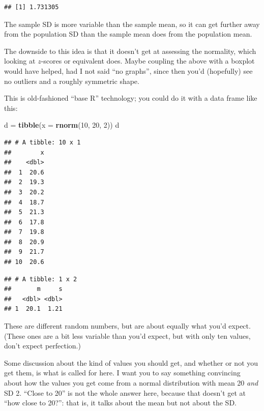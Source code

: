 \documentclass[]{tufte-book}
\newenvironment{Shaded}{}{}
\newcommand{\DataTypeTok}[1]{\textcolor[rgb]{0.56,0.13,0.00}{#1}}
\newcommand{\DecValTok}[1]{\textcolor[rgb]{0.25,0.63,0.44}{#1}}
\newcommand{\KeywordTok}[1]{\textcolor[rgb]{0.00,0.44,0.13}{\textbf{#1}}}
\newcommand{\NormalTok}[1]{#1}
\newcommand{\OperatorTok}[1]{\textcolor[rgb]{0.40,0.40,0.40}{#1}}
\newcommand{\StringTok}[1]{\textcolor[rgb]{0.25,0.44,0.63}{#1}}
\theoremstyle{definition}
\theoremstyle{definition}
\theoremstyle{definition}
\theoremstyle{remark}
\begin{document}
\begin{verbatim}
## [1] 1.731305
\end{verbatim}

The sample SD is more variable than the sample mean, so it can get
further away from the population SD than the sample mean does from the
population mean.

The downside to this idea is that it doesn't get at assessing the
normality, which looking at \(z\)-scores or equivalent does. Maybe
coupling the above with a boxplot would have helped, had I not said ``no
graphs'', since then you'd (hopefully) see no outliers and a roughly
symmetric shape.

This is old-fashioned ``base R'' technology; you could do it with a data
frame like this:

\begin{Shaded}
\begin{Highlighting}[]
\NormalTok{d =}\StringTok{ }\KeywordTok{tibble}\NormalTok{(}\DataTypeTok{x =} \KeywordTok{rnorm}\NormalTok{(}\DecValTok{10}\NormalTok{, }\DecValTok{20}\NormalTok{, }\DecValTok{2}\NormalTok{))}
\NormalTok{d}
\end{Highlighting}
\end{Shaded}

\begin{verbatim}
## # A tibble: 10 x 1
##        x
##    <dbl>
##  1  20.6
##  2  19.3
##  3  20.2
##  4  18.7
##  5  21.3
##  6  17.8
##  7  19.8
##  8  20.9
##  9  21.7
## 10  20.6
\end{verbatim}

\begin{Shaded}
\end{Shaded}

\begin{verbatim}
## # A tibble: 1 x 2
##       m     s
##   <dbl> <dbl>
## 1  20.1  1.21
\end{verbatim}

These are different random numbers, but are about equally what you'd
expect. (These ones are a bit less variable than you'd expect, but with
only ten values, don't expect perfection.)

Some discussion about the kind of values you should get, and whether or
not you get them, is what is called for here. I want you to say
something convincing about how the values you get come from a normal
distribution with mean 20 \emph{and} SD 2. ``Close to 20'' is not the
whole answer here, because that doesn't get at ``how close to 20?'':
that is, it talks about the mean but not about the SD.
\end{document}
